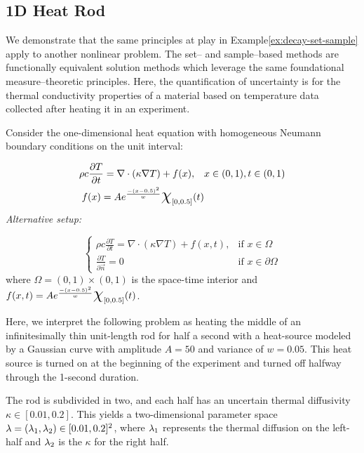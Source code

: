 \subsection{1D Heat Rod}\label{ex:heat-set-sample}

We demonstrate that the same principles at play in Example\ref{ex:decay-set-sample} apply to another nonlinear problem.
The set-- and sample--based methods are functionally equivalent solution methods which leverage the same foundational measure--theoretic principles.
Here, the quantification of uncertainty is for the thermal conductivity properties of a material based on temperature data collected after heating it in an experiment.


Consider the one-dimensional heat equation with homogeneous Neumann boundary conditions on the unit interval:

\begin{equation}
\begin{split}
\rho c \frac{\partial T}{\partial t} = \nabla \cdot ( \kappa \nabla T) + f(x), \quad & x\in (0,1), t\in (0,1) \\
f(x) = A e^\frac{- (x-0.5)^2}{w} \Chi_{[0,0.5]}(t)
\end{split}
\end{equation}
\emph{Alternative setup: }

\begin{equation}
\begin{cases}
\rho c \frac{\partial T}{\partial t} = \nabla \cdot ( \kappa \nabla T) + f(x,t), & \text{if } x\in \Omega \\
\frac{\partial T}{\partial \vec{n}} = 0 & \text{if } x\in \partial \Omega
\end{cases}
\end{equation}
where $\Omega = (0,1)\times (0,1)$ is the space-time interior and $f(x,t) = A e^\frac{- (x-0.5)^2}{w} \Chi_{[0,0.5]}(t)$.

Here, we interpret the following problem as heating the middle of an infinitesimally thin unit-length rod for half a second with a heat-source modeled by a Gaussian curve with amplitude $A=50$ and variance of $w=0.05$.
This heat source is turned on at the beginning of the experiment and turned off halfway through the 1-second duration.

The rod is subdivided in two, and each half has an uncertain thermal diffusivity $\kappa \in [0.01, 0.2]$.
This yields a two-dimensional parameter space $\lambda = (\lambda_1, \lambda_2) \in [0.01, 0.2]^2$, where $\lambda_1$ represents the thermal diffusion on the left-half and $\lambda_2$ is the $\kappa$ for the right half.

